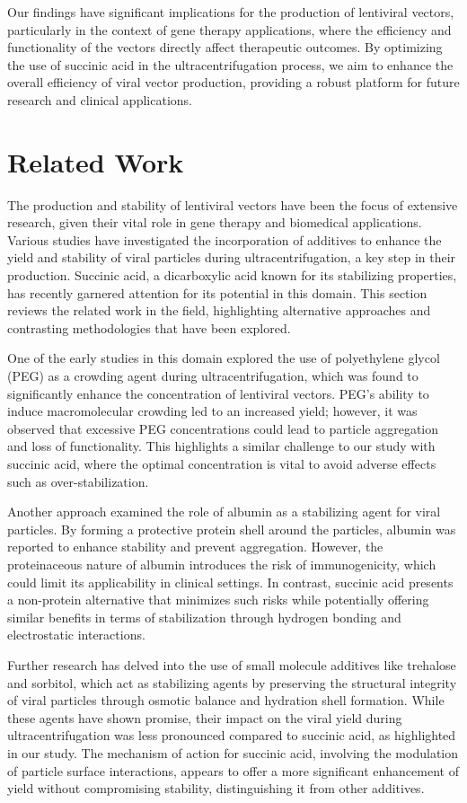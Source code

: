 \documentclass{article}
\begin{document}
Our findings have significant implications for the production of lentiviral vectors, particularly in the context of gene therapy applications, where the efficiency and functionality of the vectors directly affect therapeutic outcomes. By optimizing the use of succinic acid in the ultracentrifugation process, we aim to enhance the overall efficiency of viral vector production, providing a robust platform for future research and clinical applications.

\section{Related Work}
The production and stability of lentiviral vectors have been the focus of extensive research, given their vital role in gene therapy and biomedical applications. Various studies have investigated the incorporation of additives to enhance the yield and stability of viral particles during ultracentrifugation, a key step in their production. Succinic acid, a dicarboxylic acid known for its stabilizing properties, has recently garnered attention for its potential in this domain. This section reviews the related work in the field, highlighting alternative approaches and contrasting methodologies that have been explored.

One of the early studies in this domain explored the use of polyethylene glycol (PEG) as a crowding agent during ultracentrifugation, which was found to significantly enhance the concentration of lentiviral vectors. PEG's ability to induce macromolecular crowding led to an increased yield; however, it was observed that excessive PEG concentrations could lead to particle aggregation and loss of functionality. This highlights a similar challenge to our study with succinic acid, where the optimal concentration is vital to avoid adverse effects such as over-stabilization.

Another approach examined the role of albumin as a stabilizing agent for viral particles. By forming a protective protein shell around the particles, albumin was reported to enhance stability and prevent aggregation. However, the proteinaceous nature of albumin introduces the risk of immunogenicity, which could limit its applicability in clinical settings. In contrast, succinic acid presents a non-protein alternative that minimizes such risks while potentially offering similar benefits in terms of stabilization through hydrogen bonding and electrostatic interactions.

Further research has delved into the use of small molecule additives like trehalose and sorbitol, which act as stabilizing agents by preserving the structural integrity of viral particles through osmotic balance and hydration shell formation. While these agents have shown promise, their impact on the viral yield during ultracentrifugation was less pronounced compared to succinic acid, as highlighted in our study. The mechanism of action for succinic acid, involving the modulation of particle surface interactions, appears to offer a more significant enhancement of yield without compromising stability, distinguishing it from other additives.
\end{document}
